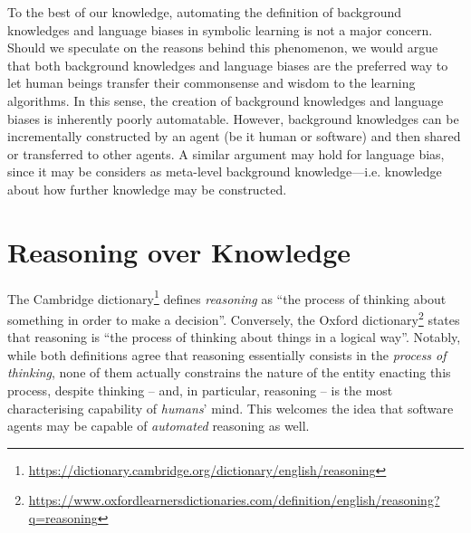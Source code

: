 \documentclass[12pt,a4paper,openright,twoside]{book}
\begin{document}
To the best of our knowledge, automating the definition of background knowledges and language biases in symbolic learning is not a major concern.
%
Should we speculate on the reasons behind this phenomenon, we would argue that both background knowledges and language biases are the preferred way to let human beings transfer their commonsense and wisdom to the learning algorithms.
%
In this sense, the creation of background knowledges and language biases is inherently poorly automatable.
%
However, background knowledges can be incrementally constructed by an agent (be it human or software) and then shared or transferred to other agents.
%
A similar argument may hold for language bias, since it may be considers as meta-level background knowledge---i.e. knowledge about how further knowledge may be constructed.



\chapter{Reasoning over Knowledge}\label{chap:reasoning}

The Cambridge dictionary\footnote{\url{https://dictionary.cambridge.org/dictionary/english/reasoning}} defines \emph{reasoning} as
%
``the process of thinking about something in order to make a decision''.
%
Conversely, the Oxford dictionary\footnote{\url{https://www.oxfordlearnersdictionaries.com/definition/english/reasoning?q=reasoning}} states that reasoning is
%
``the process of thinking about things in a logical way''.
%
Notably, while both definitions agree that reasoning essentially consists in the \emph{process of thinking}, none of them actually constrains the nature of the entity enacting this process, despite thinking -- and, in particular, reasoning -- is the most characterising capability of \emph{humans}' mind.
%
This welcomes the idea that software agents may be capable of \emph{automated} reasoning as well.
\end{document}
